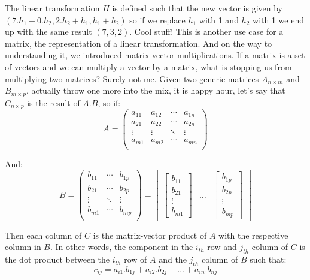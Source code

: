 \documentclass[a4,12pt,twosided,openany]{memoir}
\begin{document}
\par 
\indent
The linear transformation $H$ is defined such that the new vector is given by $(7.h_1 + 0.h_2, 2.h_2+h_1, h_1+h_2)$ so if we replace $h_1$ with 1 and $h_2$ with 1 we end up with the same result $(7,3,2)$. Cool stuff! This is another use case for a matrix, the representation of a linear transformation. And on the way to understanding it, we introduced matrix-vector multiplications. If a matrix is a set of vectors and we can multiply a vector by a matrix, what is stopping us from multiplying two matrices? Surely not me. Given two generic matrices $A_{n\times m}$ and $B_{m\times p}$, actually throw one more into the mix, it is happy hour,  let’s say that  $C_{n\times p}$ is the result of $A.B$, so if:
\[ A = 
\begin{pmatrix}
a_{11} & a_{12} & \cdots & a_{1n}\\
a_{21} & a_{22} & \cdots & a_{2n}\\
\vdots & \vdots & \ddots & \vdots\\
a_{m1} & a_{m2} & \cdots & a_{mn}\\
\end{pmatrix}
\]
\par 
\indent
And:
\[B = \begin{pmatrix}
b_{11} &  \cdots & b_{1p}\\
b_{21} &  \cdots & b_{2p}\\
\vdots & \ddots & \vdots\\
b_{m1} & \cdots & b_{mp}\\
\end{pmatrix} = 
\begin{bmatrix}
    \begin{bmatrix}
             b_{11} \\
             b_{21} \\
             \vdots \\
             b_{m1}
    \end{bmatrix}   &  \hdots & \begin{bmatrix}
             b_{1p} \\
             b_{2p} \\
             \vdots \\
             b_{mp}
    \end{bmatrix} 
\end{bmatrix}
\]
\par 
\indent
Then each column of $C$ is the matrix-vector product of $A$ with the respective column in $B$. In other words, the component in the $i_{th}$ row and $j_{th}$ column of $C$ is the dot product between the $i_{th}$ row of $A$ and the $j_{th}$ column of $B$ such that:
\[
c_{ij}=a_{i1}.b_{1j}+a_{i2}.b_{2j}+\hdots+a_{in}.b_{nj}
\]
\end{document}
